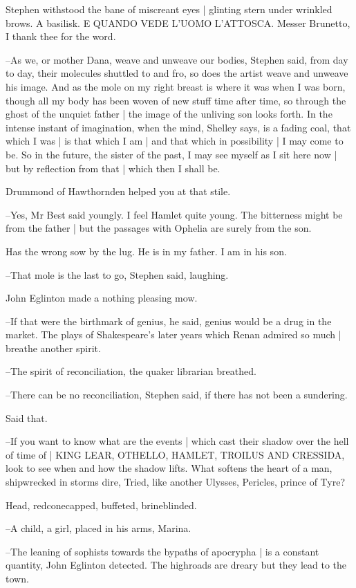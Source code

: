 Stephen withstood the bane of miscreant eyes |
glinting stern under wrinkled brows.
A basilisk.
E QUANDO VEDE L'UOMO L'ATTOSCA.
Messer Brunetto,
I thank thee for the word.

--As we,
or mother Dana,
weave and unweave our bodies,
Stephen said,
from day to day,
their molecules shuttled to and fro,
so does the artist weave and unweave his image.
And as the mole on my right breast is where it was when I was born,
though all my body has been woven of new stuff time after time,
so through the ghost of the unquiet father |
the image of the unliving son looks forth.
In the intense instant of imagination,
when the mind,
Shelley says,
is a fading coal,
that which I was |
is that which I am |
and that which in possibility |
I may come to be.
So in the future,
the sister of the past,
I may see myself as I sit here now |
but by reflection from that |
which then I shall be.

Drummond of Hawthornden helped you at that stile.

--Yes,
Mr Best said youngly.
I feel Hamlet quite young.
The bitterness might be from the father |
but the passages with Ophelia are surely from the son.

Has the wrong sow by the lug.
He is in my father.
I am in his son.

--That mole is the last to go,
Stephen said,
laughing.

John Eglinton made a nothing pleasing mow.

--If that were the birthmark of genius,
he said,
genius would be a drug in the market.
The plays of Shakespeare's later years which Renan admired so much |
breathe another spirit.

--The spirit of reconciliation,
the quaker librarian breathed.

--There can be no reconciliation,
Stephen said,
if there has not been a sundering.

Said that.

--If you want to know what are the events |
which cast their shadow over the hell of time of |
KING LEAR,
OTHELLO,
HAMLET,
TROILUS AND CRESSIDA,
look to see when and how the shadow lifts.
What softens the heart of a man,
shipwrecked in storms dire,
Tried,
like another Ulysses,
Pericles, prince of Tyre?

Head,
redconecapped,
buffeted,
brineblinded.

--A child, a girl,
placed in his arms,
Marina.

--The leaning of sophists towards the bypaths of apocrypha |
is a constant quantity,
John Eglinton detected.
The highroads are dreary but they lead to the town.

